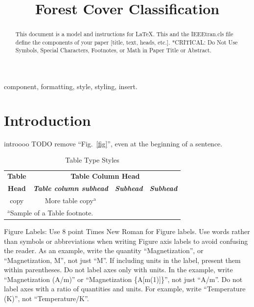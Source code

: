 \documentclass[10pt, conference]{IEEEtran}
\begin{document}
\title{Forest Cover Classification\\

}

\author{
}

\maketitle

\begin{abstract}
This document is a model and instructions for \LaTeX.
This and the IEEEtran.cls file define the components of your paper [title, text, heads, etc.]. *CRITICAL: Do Not Use Symbols, Special Characters, Footnotes, 
or Math in Paper Title or Abstract.
\end{abstract}

\begin{IEEEkeywords}
component, formatting, style, styling, insert.
\end{IEEEkeywords}

\section{Introduction}
introooo TODO remove
``Fig.~\ref{fig}'', even at the beginning of a sentence.

\begin{table}[htbp]
\caption{Table Type Styles}
\begin{center}
\begin{tabular}{|c|c|c|c|}
\hline
\textbf{Table}&\multicolumn{3}{|c|}{\textbf{Table Column Head}} \\
\cline{2-4} 
\textbf{Head} & \textbf{\textit{Table column subhead}}& \textbf{\textit{Subhead}}& \textbf{\textit{Subhead}} \\
\hline
copy& More table copy$^{\mathrm{a}}$& &  \\
\hline
\multicolumn{4}{l}{$^{\mathrm{a}}$Sample of a Table footnote.}
\end{tabular}
\label{tab1}
\end{center}
\end{table}

Figure Labels: Use 8 point Times New Roman for Figure labels. Use words 
rather than symbols or abbreviations when writing Figure axis labels to 
avoid confusing the reader. As an example, write the quantity 
``Magnetization'', or ``Magnetization, M'', not just ``M''. If including 
units in the label, present them within parentheses. Do not label axes only 
with units. In the example, write ``Magnetization (A/m)'' or ``Magnetization 
\{A[m(1)]\}'', not just ``A/m''. Do not label axes with a ratio of 
quantities and units. For example, write ``Temperature (K)'', not 
``Temperature/K''.
\end{document}
